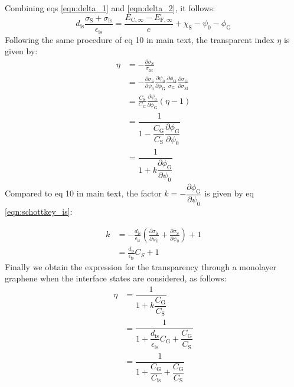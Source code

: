 \documentclass[manuscript=suppinfo]{achemso}
\newcommand*\subs[1]{_{\text{#1}}} %
\begin{document}
Combining eqs \ref{eqn:delta_1} and \ref{eqn:delta_2}, it follows:
\begin{equation}
  d\subs{is}\frac{\sigma\subs{S}+\sigma\subs{is}}{\epsilon\subs{is}} = 
  \frac{E_{\mathrm C,\infty} - E_{\mathrm F,\infty}}{e} + \chi\subs{S} -\psi_0 - \phi\subs{G}
  \label{eqn:schottkey_is}
\end{equation}
Following the same procedure of eq 10 in main text, the transparent index $\eta$ is given by:
\begin{equation}
  \begin{aligned}
      \eta &= -\frac{\partial \sigma\subs{S}}{\sigma\subs{M}} \\
           &= -\frac{\partial \sigma\subs{S}}{\partial \psi_0} \frac{\partial \psi_0}{\partial \phi\subs{G}} \frac{\partial \phi\subs{G}}{\sigma\subs{G}} \frac{\partial \sigma\subs{G}}{\partial \sigma\subs{M}} \\
           &= \frac{C\subs{S}}{C\subs{G}} \frac{\partial \psi_0}{\partial \phi\subs{G}}(\eta-1)\\
           &= \dfrac{1}{1 - \dfrac{C\subs{G}}{C\subs{S}}\dfrac{\partial \phi\subs{G}}{\partial \psi_0}}\\
           &= \dfrac{1}{1+k\dfrac{\partial \phi\subs{G}}{\partial \psi\subs{0}}}
  \end{aligned}
\end{equation}
Compared to eq 10 in main text, the factor $k=-\dfrac{\partial \phi\subs{G}}{\partial \psi\subs{0}}$ is given by eq \ref{eqn:schottkey_is}:

\begin{equation}
  \begin{aligned}
      k &= -\frac{d\subs{is}}{\epsilon\subs{is}}( 
            \frac{\partial \sigma\subs{is}} {\partial \psi_0} 
            + \frac{\partial \sigma\subs{S}}{\partial \psi_0} ) +1 \\
        &=  \frac{d\subs{is}}{\epsilon\subs{is}}C_{S} +1
  \end{aligned}
\end{equation}
Finally we obtain the expression for the transparency through a monolayer graphene when the interface states are considered, as follows:
\begin{equation}
  \begin{aligned}
      \eta &= \dfrac{1}{1+k\dfrac{C\subs{G}}{C\subs{S}}}\\
           &= \dfrac{1}{1+\dfrac{d\subs{is}}{\epsilon\subs{is}}C\subs{G} +\dfrac{C\subs{G}}{C\subs{S}} }\\
           &= \dfrac{1}{1+\dfrac{C\subs{G}}{C\subs{is}} +\dfrac{C\subs{G}}{C\subs{S}} }
  \end{aligned}
\end{equation}
\end{document}
